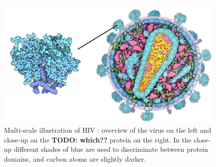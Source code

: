 \documentclass{egpubl}
\begin{document}
	
	\begin{figure}
		\centering
		\includegraphics[width=1\linewidth]{Figures/motivation}
				\caption{Multi-scale illustration of HIV \cite{RCSBPDB2011}: overview of the virus on the left and close-up on the \textbf{TODO: which??} protein on the right. In the close-up different shades of blue are used to discriminate between protein domains, and carbon atoms are slightly darker. }
		\label{fig:motivation}
	\end{figure}
	
	
	
\end{document}
